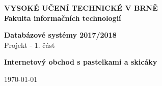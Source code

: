 \pagestyle{empty}
\begin{titlepage}
	\centering

	{\fontsize{20pt}{15pt}\bfseries 
		VYSOKÉ UČENÍ TECHNICKÉ V BRNĚ\\
		\vspace{8pt}
		Fakulta informačních technologií
	}

	\begin{figure}[H]
		\centering
		\vspace{-30pt}
		
	\end{figure}

	\vfill

	{\Large \bfseries Databázové systémy 2017/2018\\}
	\vspace*{2pt}
	{\Large Projekt - 1. část}

	\vspace*{32pt}

	{\fontsize{16pt}{15pt}\bfseries Internetový obchod s pastelkami a skicáky}

	\vfill

	{\Large \today \hfill \theauthor}
\end{titlepage}